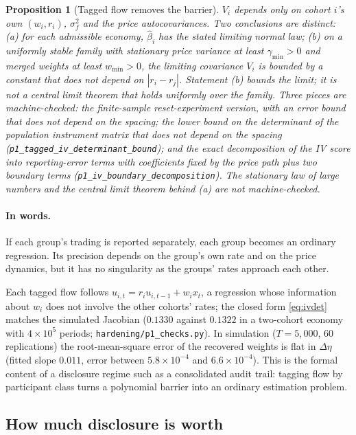 \documentclass[12pt]{article}
\newtheorem{proposition}[theorem]{Proposition}
\theoremstyle{definition}
\theoremstyle{remark}
\begin{document}
\begin{proposition}[Tagged flow removes the barrier]
$V_i$ depends only on cohort $i$'s own $(w_i,r_i)$, $\sigma_f^2$ and the price autocovariances. Two conclusions are distinct: (a) for each admissible economy, $\hat\beta_i$ has the stated limiting normal law; (b) on a uniformly stable family with stationary price variance at least $\gamma_{\min}>0$ and merged weights at least $w_{\min}>0$, the limiting covariance $V_i$ is bounded by a constant that does not depend on $|r_i-r_j|$. Statement (b) bounds the limit; it is not a central limit theorem that holds uniformly over the family. Three pieces are machine-checked: the finite-sample reset-experiment version, with an error bound that does not depend on the spacing; the lower bound on the determinant of the population instrument matrix that does not depend on the spacing (\texttt{p1\_tagged\_iv\_determinant\_bound}); and the exact decomposition of the IV score into reporting-error terms with coefficients fixed by the price path plus two boundary terms (\texttt{p1\_iv\_boundary\_decomposition}). The stationary law of large numbers and the central limit theorem behind (a) are not machine-checked.
\end{proposition}

\paragraph{In words.} If each group's trading is reported separately, each group becomes an ordinary regression. Its precision depends on the group's own rate and on the price dynamics, but it has no singularity as the groups' rates approach each other.


Each tagged flow follows $u_{i,t}=r_iu_{i,t-1}+w_ix_t$, a regression whose information about $w_i$ does not involve the other cohorts' rates; the closed form \eqref{eq:ivdet} matches the simulated Jacobian ($0.1330$ against $0.1322$ in a two-cohort economy with $4\times10^5$ periods; \texttt{hardening/p1\_checks.py}). In simulation ($T=5{,}000$, 60 replications) the root-mean-square error of the recovered weights is flat in $\Delta\eta$ (fitted slope $0.011$, error between $5.8\times10^{-4}$ and $6.6\times10^{-4}$). This is the formal content of a disclosure regime such as a consolidated audit trail: tagging flow by participant class turns a polynomial barrier into an ordinary estimation problem.

\subsection{How much disclosure is worth}\label{sec:discvalue}
\end{document}
